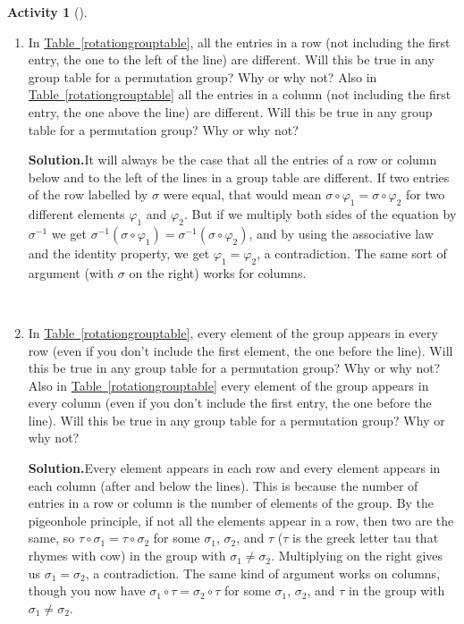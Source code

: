 \documentclass[10pt,]{book}
\theoremstyle{plain}
\theoremstyle{definition}
\newtheorem{activity}[project]{Activity}
\numberwithin{equation}{chapter}
\begin{document}
\begin{activity}[]\label{activity-250}
~\par
\begin{enumerate}[label=(\alph*)]
 \item In \hyperref[rotationgrouptable]{Table~\ref{rotationgrouptable}}, all the entries in a row (not including the first entry, the one to the left of the line) are different. Will this be true in any group table for a permutation group? Why or why not? Also in \hyperref[rotationgrouptable]{Table~\ref{rotationgrouptable}} all the entries in a column (not including the first entry, the one above the line) are different. Will this be true in any group table for a permutation group? Why or why not?%
\par\medskip\noindent%
\textbf{Solution.}\quad It will always be the case that all the entries of a row or column below and to the left of the lines in a group table are different. If two entries of the row labelled by \(\sigma\) were equal, that would mean \(\sigma\circ\varphi_1 =
\sigma\circ\varphi_2\) for two different elements \(\varphi_1\) and \(\varphi_2\). But if we multiply both sides of the equation by \(\sigma^{-1}\) we get \(\sigma^{-1}(\sigma\circ\varphi_1) =
\sigma^{-1}(\sigma\circ\varphi_2)\), and by using the associative law and the identity property, we get \(\varphi_1=\varphi_2\), a contradiction. The same sort of argument (with \(\sigma\) on the right) works for columns.%

~\par
\item In \hyperref[rotationgrouptable]{Table~\ref{rotationgrouptable}}, every element of the group appears in every row (even if you don't include the first element, the one before the line). Will this be true in any group table for a permutation group? Why or why not? Also in \hyperref[rotationgrouptable]{Table~\ref{rotationgrouptable}} every element of the group appears in every column (even if you don't include the first entry, the one before the line). Will this be true in any group table for a permutation group? Why or why not?%
\par\medskip\noindent%
\textbf{Solution.}\quad Every element appears in each row and every element appears in each column (after and below the lines). This is because the number of entries in a row or column is the number of elements of the group. By the pigeonhole principle, if not all the elements appear in a row, then two are the same, so \(\tau\circ \sigma_1 =\tau\circ\sigma_2\) for some \(\sigma_1\), \(\sigma_2\), and \(\tau\) (\(\tau\) is the greek letter tau that rhymes with cow) in the group with \(\sigma_1\not=
\sigma_2\). Multiplying on the right gives us \(\sigma_1 = \sigma_2\), a contradiction. The same kind of argument works on columns, though you now have \(\sigma_1\circ \tau =\sigma_2\circ \tau\) for some \(\sigma_1\), \(\sigma_2\), and \(\tau\) in the group with \(\sigma_1\not= \sigma_2\).%

\end{enumerate}
\end{activity}
\end{document}
